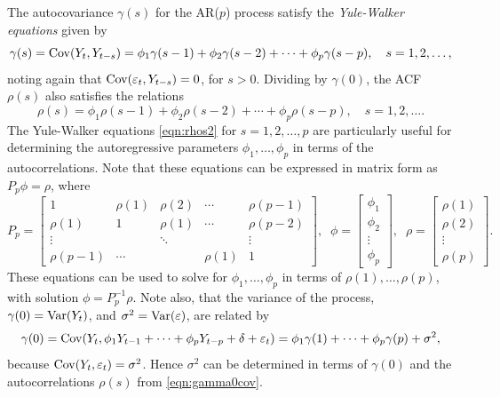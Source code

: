 The autocovariance $\gamma(s)$ for the AR($p$) process satisfy the \emph{Yule-Walker equations} given by
	\begin{equation*}
	\gamma(s)= \operatorname{Cov}(Y_t,Y_{t-s}) = \phi_1 \gamma(s-1) + \phi_2 \gamma(s-2) + \cdots + \phi_p \gamma(s-p), \quad s= 1,2,\ldots,
	\end{equation*}
noting again that $\operatorname{Cov}(\varepsilon_t,Y_{t-s})= 0$, for $s > 0$. Dividing by $\gamma(0)$, the ACF $\rho(s)$ also satisfies the relations
	\begin{equation} \label{eqn:rhos2}
	\rho(s) = \phi_1 \rho(s-1) + \phi_2 \rho(s-2) + \cdots + \phi_p \rho(s-p), \quad s= 1,2,\ldots.
	\end{equation}
The Yule-Walker equations \eqref{eqn:rhos2} for $s= 1, 2, \ldots, p$ are particularly useful for determining the autoregressive parameters $\phi_1, \ldots, \phi_p$ in terms of the autocorrelations. Note that these equations can be expressed in matrix form as $P_p \phi = \rho$, where
	\begin{equation} \label{eqn:matrix}
	P_p = 
	\begin{bmatrix}
	1 & \rho(1) & \rho(2) & \cdots & \rho(p-1) \\
	\rho(1) & 1 & \rho(1) & \cdots & \rho(p-2)\\
	\vdots & & \ddots & & \vdots \\
	\rho(p-1) & \cdots & & \rho(1) & 1
	\end{bmatrix}, \;\;
	\phi= \begin{bmatrix} \phi_1 \\ \phi_2 \\ \vdots \\ \phi_p \end{bmatrix},\;\;
	\rho= \begin{bmatrix} \rho(1) \\ \rho(2) \\ \vdots \\ \rho(p) \end{bmatrix}.
	\end{equation}
These equations can be used to solve for $\phi_1, \ldots, \phi_p$ in terms of $\rho(1), \ldots, \rho(p)$, with solution $\phi = P_p^{-1} \rho$. Note also, that the variance of the process, $\gamma(0) = \operatorname{Var}(Y_t)$, and $\sigma^2= \operatorname{Var}(\varepsilon)$, are related by
	\begin{equation} \label{eqn:gamma0cov}
	\gamma(0)= \cov(Y_t, \phi_1 Y_{t-1} + \cdots + \phi_p Y_{t-p} + \delta + \varepsilon_t)= \phi_1 \gamma(1) + \cdots + \phi_p \gamma(p) + \sigma^2,
	\end{equation}
because $\operatorname{Cov}(Y_t, \varepsilon_t)= \sigma^2$. Hence $\sigma^2$ can be determined in terms of $\gamma(0)$ and the autocorrelations $\rho(s)$ from \eqref{eqn:gamma0cov}.



